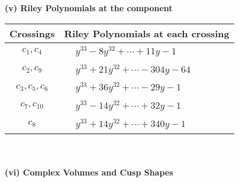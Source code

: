 \documentclass[1p]{elsarticle_modified}
\theoremstyle{definition}
\begin{document}
\newpage\renewcommand{\arraystretch}{1}
\flushleft \textbf{(v) Riley Polynomials at the component}\newline \\
\begin{tabular}{m{50pt}|m{274pt}}
Crossings & \hspace{64pt}Riley Polynomials at each crossing \\
\hline $$\begin{aligned}c_{1},c_{4}\end{aligned}$$&$\begin{aligned}
&y^{33}-8 y^{32}+\cdots+11 y-1
\end{aligned}$\\
\hline $$\begin{aligned}c_{2},c_{9}\end{aligned}$$&$\begin{aligned}
&y^{33}+21 y^{32}+\cdots-304 y-64
\end{aligned}$\\
\hline $$\begin{aligned}c_{3},c_{5},c_{6}\end{aligned}$$&$\begin{aligned}
&y^{33}+36 y^{32}+\cdots-29 y-1
\end{aligned}$\\
\hline $$\begin{aligned}c_{7},c_{10}\end{aligned}$$&$\begin{aligned}
&y^{33}-14 y^{32}+\cdots+32 y-1
\end{aligned}$\\
\hline $$\begin{aligned}c_{8}\end{aligned}$$&$\begin{aligned}
&y^{33}+14 y^{32}+\cdots+340 y-1
\end{aligned}$\\
\hline
\end{tabular}\\~\\
\newpage\flushleft \textbf{(vi) Complex Volumes and Cusp Shapes}
\end{document}
